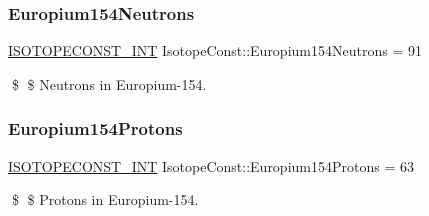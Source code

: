 \subsubsection{\texorpdfstring{Europium154\+Neutrons}{Europium154Neutrons}}
{\footnotesize\ttfamily \mbox{\hyperlink{group___isotope_const-_macros_ga5f18360b3e99483a35c32d789e62621c}{I\+S\+O\+T\+O\+P\+E\+C\+O\+N\+S\+T\+\_\+\+I\+NT}} Isotope\+Const\+::\+Europium154\+Neutrons = 91}

\$ \$ Neutrons in Europium-\/154. \mbox{\label{group___isotope_const-_europium-_eu154_ga70a3de9d424322749bbfcaa6d4210155}} 
\subsubsection{\texorpdfstring{Europium154\+Protons}{Europium154Protons}}
{\footnotesize\ttfamily \mbox{\hyperlink{group___isotope_const-_macros_ga5f18360b3e99483a35c32d789e62621c}{I\+S\+O\+T\+O\+P\+E\+C\+O\+N\+S\+T\+\_\+\+I\+NT}} Isotope\+Const\+::\+Europium154\+Protons = 63}

\$ \$ Protons in Europium-\/154. 